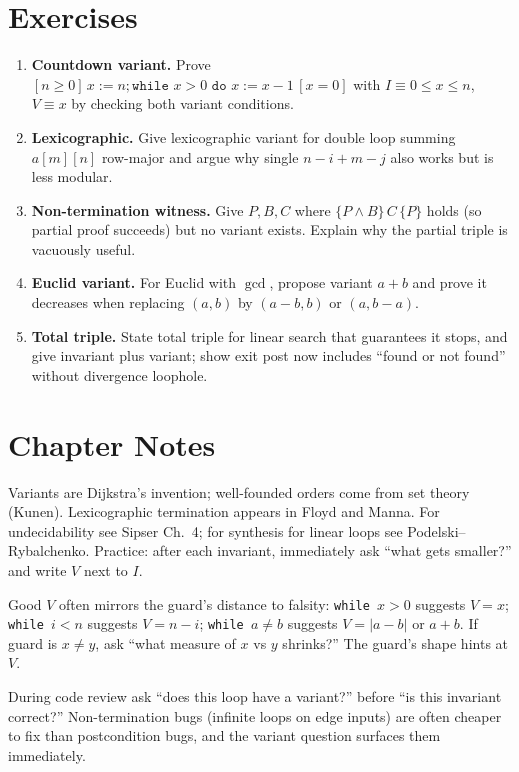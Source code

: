 \section{Exercises}
\label{sec:ch05-exercises}
\begin{enumerate}[label=E5.\arabic*, leftmargin=*, itemsep=0.6em]
    \item \textbf{Countdown variant.} Prove $[n\ge0]\,x:=n;\texttt{while }x>0\texttt{ do }x:=x-1\,[x=0]$ with $I\equiv0\le x\le n$, $V\equiv x$ by checking both variant conditions.
    \item \textbf{Lexicographic.} Give lexicographic variant for double loop summing $a[m][n]$ row-major and argue why single $n-i+m-j$ also works but is less modular.
    \item \textbf{Non-termination witness.} Give $P,B,C$ where $\{P\land B\}\,C\,\{P\}$ holds (so partial proof succeeds) but no variant exists. Explain why the partial triple is vacuously useful.
    \item \textbf{Euclid variant.} For Euclid with $\gcd$, propose variant $a+b$ and prove it decreases when replacing $(a,b)$ by $(a-b,b)$ or $(a,b-a)$.
    \item \textbf{Total triple.} State total triple for linear search that guarantees it stops, and give invariant plus variant; show exit post now includes ``found or not found'' without divergence loophole.
\end{enumerate}

\section*{Chapter Notes}
Variants are Dijkstra's invention; well-founded orders come from set theory (Kunen). Lexicographic termination appears in Floyd and Manna. For undecidability see Sipser Ch.~4; for synthesis for linear loops see Podelski--Rybalchenko. Practice: after each invariant, immediately ask ``what gets smaller?'' and write $V$ next to $I$.

\smallskip
\begin{remark}
Good $V$ often mirrors the guard's distance to falsity: \texttt{while $x>0$} suggests $V=x$; \texttt{while $i<n$} suggests $V=n-i$; \texttt{while $a\neq b$} suggests $V=|a-b|$ or $a+b$. If guard is $x\neq y$, ask ``what measure of $x$ vs $y$ shrinks?'' The guard's shape hints at $V$.
\end{remark}

\smallskip
\begin{remark}
During code review ask ``does this loop have a variant?'' before ``is this invariant correct?'' Non-termination bugs (infinite loops on edge inputs) are often cheaper to fix than postcondition bugs, and the variant question surfaces them immediately.
\end{remark}
